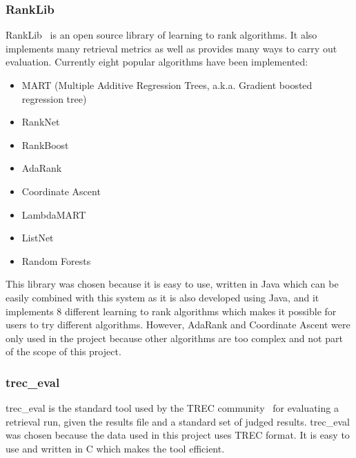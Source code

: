 \subsubsection{RankLib}\label{section:rankLib}
RankLib~\cite{ranklib} is an open source library of learning to rank algorithms. It also implements many retrieval metrics as well as provides many ways to carry out evaluation.
Currently eight popular algorithms have been implemented:
\begin{itemize}
 \item MART (Multiple Additive Regression Trees, a.k.a. Gradient boosted regression tree)
 \item RankNet
 \item RankBoost
 \item AdaRank
 \item Coordinate Ascent
 \item LambdaMART
 \item ListNet
 \item Random Forests
\end{itemize}

This library was chosen because it is easy to use, written in Java which can be easily combined with this system as it is also developed using Java, and
it implements 8 different learning to rank algorithms which makes it possible for users to try different algorithms.
However, AdaRank and Coordinate Ascent were only used in the project because other algorithms are too complex and not part of the scope of this project.

\subsubsection{trec\_eval}
trec\_eval is the standard tool used by the TREC community~\cite{trec} for evaluating a retrieval run, given the results file and a
standard set of judged results. trec\_eval was chosen because the data used in this project uses TREC format. 
It is easy to use and written in C which makes the tool efficient.


